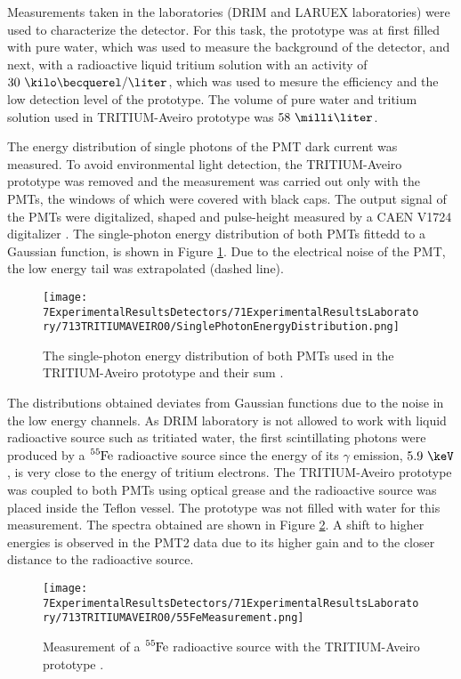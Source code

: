 Measurements taken in the laboratories (DRIM and LARUEX laboratories) were used to characterize the detector. For this task, the prototype was at first filled with pure water, which was used to measure the background of the detector, and next, with a radioactive liquid tritium solution with an activity of $30~\kilo\becquerel/\liter$, which was used to mesure the efficiency and the low detection level of the prototype. The volume of pure water and tritium solution used in TRITIUM-Aveiro prototype was $58~\milli\liter$. 

The energy distribution of single photons of the PMT dark current was measured. To avoid environmental light detection, the TRITIUM-Aveiro prototype was removed and the measurement was carried out only with the PMTs, the windows of which were covered with black caps. The output signal of the PMTs were digitalized, shaped and pulse-height measured by a CAEN V1724 digitalizer \cite{CAENV1724}. The single-photon energy distribution of both PMTs fittedd to a Gaussian function, is shown in Figure \ref{fig:SinglePhotonEnergyDistribution}. Due to the electrical noise of the PMT, the low energy tail was extrapolated (dashed line).

\begin{figure}[h]
\centering
\texttt{[image: 7ExperimentalResultsDetectors/71ExperimentalResultsLaboratory/713TRITIUMAVEIRO0/SinglePhotonEnergyDistribution.png]}
\caption{The single-photon energy distribution of both PMTs used in the TRITIUM-Aveiro prototype and their sum \cite{ExperimentalPaperCarlos}.\label{fig:SinglePhotonEnergyDistribution}}
\end{figure}

The distributions obtained deviates from Gaussian functions due to the noise in the low energy channels. As DRIM laboratory is not allowed to work with liquid radioactive source such as tritiated water, the first scintillating photons were produced by a $\ce{^{55}Fe}$ radioactive source since the energy of its $\gamma$ emission, $5.9~\keV$, is very close to the energy of tritium electrons. The TRITIUM-Aveiro prototype was coupled to both PMTs using optical grease and the radioactive source was placed inside the Teflon vessel. The prototype was not filled with water for this measurement. The spectra obtained are shown in Figure \ref{fig:55FeMeasurement}. A shift to higher energies is observed in the PMT2 data due to its higher gain and to the closer distance to the radioactive source.

\begin{figure}[h]
\centering
\texttt{[image: 7ExperimentalResultsDetectors/71ExperimentalResultsLaboratory/713TRITIUMAVEIRO0/55FeMeasurement.png]}
\caption{Measurement of a $\ce{^{55}Fe}$ radioactive source with the TRITIUM-Aveiro prototype \cite{ExperimentalPaperCarlos}.\label{fig:55FeMeasurement}}
\end{figure}

